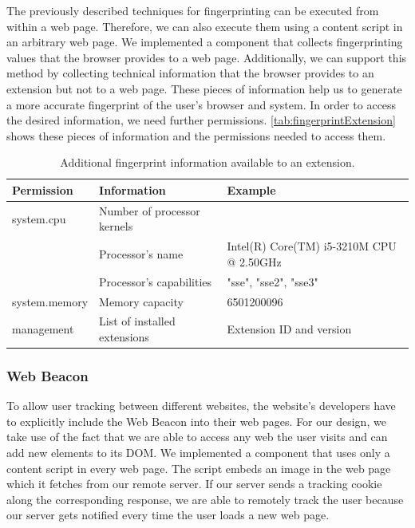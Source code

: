 	The previously described techniques for fingerprinting can be executed from within a web page. Therefore, we can also execute them using a content script in an arbitrary web page. We implemented a component that collects fingerprinting values that the browser provides to a web page. Additionally, we can support this method by collecting technical information that the browser provides to an extension but not to a web page. These pieces of information help us to generate a more accurate fingerprint of the user's browser and system. In order to access the desired information, we need further permissions. \autoref{tab:fingerprintExtension} shows these pieces of information and the permissions needed to access them. 
	
	\begin{table}[h]
		\begin{tabular}{|l|l|l|} \hline
			\textbf{Permission} & \textbf{Information} & \textbf{Example} \\ \hline
			system.cpu & Number of processor kernels & \\
			& Processor's name & Intel(R) Core(TM) i5-3210M CPU @ 2.50GHz \\
			& Processor's capabilities & "sse", "sse2", "sse3"  \\ \hline
			system.memory & Memory capacity & 6501200096 \\ \hline
			management & List of installed extensions & Extension ID and version \\ \hline
		\end{tabular}
		\caption{Additional fingerprint information available to an extension.}
		\label{tab:fingerprintExtension}
	\end{table} 
	
\subsubsection{Web Beacon}
\label{sec:webBeacon}

	To allow user tracking between different websites, the website's developers have to explicitly include the Web Beacon into their web pages. For our design, we take use of the fact that we are able to access any web the user visits and can add new elements to its DOM. We implemented a component that uses only a content script in every web page. The script embeds an image in the web page which it fetches from our remote server. If our server sends a tracking cookie along the corresponding response, we are able to remotely track the user because our server gets notified every time the user loads a new web page.  

